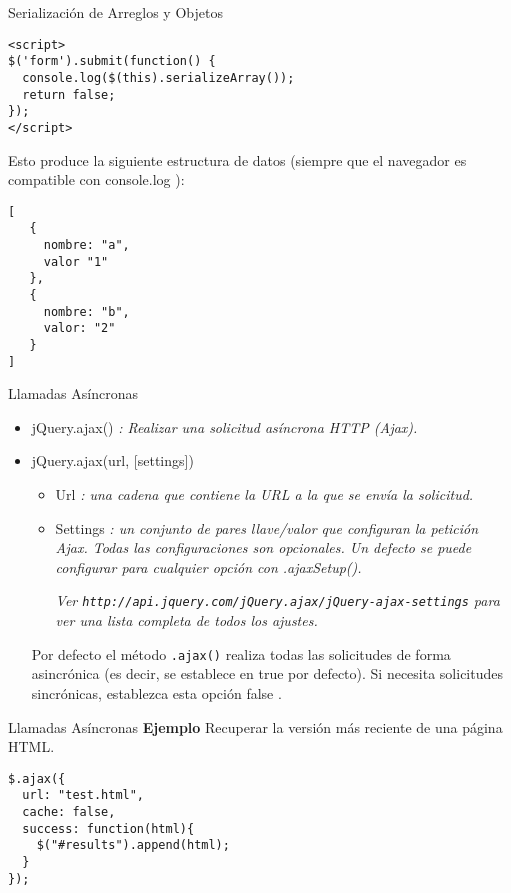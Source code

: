 \begin{frame}[fragile]{Serialización de Arreglos y Objetos} %
\begin{lstlisting}
<script>
$('form').submit(function() {
  console.log($(this).serializeArray());
  return false;
});
</script>
\end{lstlisting}
Esto produce la siguiente estructura de datos (siempre que el navegador es compatible con console.log ):
\begin{lstlisting}
[
   {
     nombre: "a",
     valor "1"
   },
   {
     nombre: "b",
     valor: "2"
   }
]
\end{lstlisting}
\end{frame}

\begin{frame}[fragile]{Llamadas Asíncronas} %
\begin{itemize}
\item jQuery.ajax() \textit{ : Realizar una solicitud asíncrona HTTP (Ajax).}
\item jQuery.ajax(url, [settings]) 
\begin{itemize}
\item Url \textit{ : una cadena que contiene la URL a la que se envía la solicitud.}
\item Settings \textit{ : un conjunto de pares llave/valor que configuran la
petición Ajax. Todas las configuraciones son opcionales. Un defecto se puede
configurar para cualquier opción con .ajaxSetup().}

\textit{Ver \texttt{http://api.jquery.com/jQuery.ajax/jQuery-ajax-settings} para ver una lista completa de todos los ajustes.}
\end{itemize}
Por defecto el método \texttt{.ajax()} realiza todas las solicitudes de forma asincrónica (es decir, se establece en true por defecto). Si necesita solicitudes sincrónicas, establezca esta opción false .  
\end{itemize}
\end{frame}

\begin{frame}[fragile]{Llamadas Asíncronas} %
\textbf{Ejemplo}
Recuperar la versión más reciente de una página HTML.
\begin{lstlisting}
$.ajax({
  url: "test.html",
  cache: false,
  success: function(html){
    $("#results").append(html);
  }
});
\end{lstlisting}
\end{frame}

